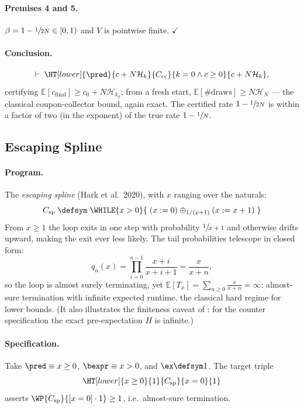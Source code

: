 \paragraph{Premises 4 and 5.}
$\beta = 1-\sfrac{1}{2N} \in [0,1)$ and $V$ is pointwise finite.
$\checkmark$

\paragraph{Conclusion.}
\[
  \vdash\; \HT[lower]{\pred}{c + N\mathcal{H}_k}
     {C_{\text{cc}}}{k = 0 \land c \geq 0}{c + N\mathcal{H}_k},
\]
certifying $\mathbb{E}[c_{\text{final}}] \geq c_0 + N\mathcal{H}_{k_0}$;
from a fresh start, $\mathbb{E}[\text{\#draws}] \geq N \mathcal{H}_N$ ---
the classical coupon-collector bound, again exact. The certified rate
$1-\sfrac{1}{2N}$ is within a factor of two (in the exponent) of the true
rate $1-\sfrac1N$.

\subsection{Escaping Spline}\label{app:bench-spline}

\paragraph{Program.}
The \emph{escaping spline} (Hark et al.\ 2020), with $x$ ranging over the
naturals:
\[
  C_{\text{sp}} \;\defsym\;
  \WHILE{x > 0}{\;
    (x \mathrel{:=} 0) \oplus_{1/(x+1)} (x \mathrel{:=} x+1)
  \;}
\]
From $x \geq 1$ the loop exits in one step with probability
$\sfrac{1}{x+1}$ and otherwise drifts upward, making the exit ever less
likely. The tail probabilities telescope in closed form:
\[
  q_n(x)
  = \prod_{i=0}^{n-1} \frac{x+i}{x+i+1}
  = \frac{x}{x+n},
\]
so the loop is almost surely terminating, yet
$\mathbb{E}[T_x] = \sum_{n \geq 0} \tfrac{x}{x+n} = \infty$: almost-sure
termination with infinite expected runtime, the classical hard regime for
lower bounds. (It also illustrates the finiteness caveat of
: for the counter specification the exact
pre-expectation $H$ is infinite.)

\paragraph{Specification.}
Take $\pred \equiv x \geq 0$, $\bexpr \equiv x > 0$, and $\ex \defsym 1$.
The target triple
\[
  \HT[lower]{x \geq 0}{1}{C_{\text{sp}}}{x = 0}{1}
\]
asserts $\WP{C_{\text{sp}}}{[x=0]\cdot 1} \geq 1$, i.e.\ almost-sure
termination.


